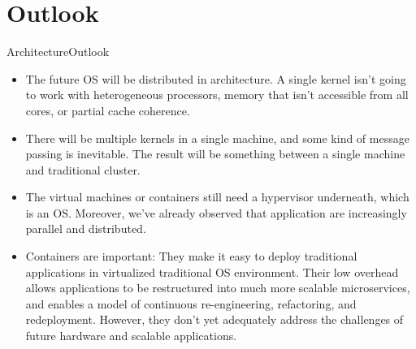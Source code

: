 \documentclass[10pt]{beamer}
\begin{document}
\section{Outlook}
\begin{frame}{Architecture}{Outlook}
  \begin{itemize}
    \item The future OS will be distributed in architecture. A single kernel
          isn't going to work with heterogeneous processors, memory that isn't
          accessible from all cores, or partial cache coherence.
    \item There will be multiple kernels in a single machine, and some kind of
          message passing is inevitable. The result will be something between a
          single machine and traditional cluster.
    \item The virtual machines or containers still need a hypervisor
          underneath, which is an OS. Moreover, we've already observed that
          application are increasingly parallel and distributed.
    \item Containers are important: They make it easy to deploy traditional
          applications in virtualized traditional OS environment. Their low
          overhead allows applications to be restructured into much more
          scalable microservices, and enables a model of continuous
          re-engineering, refactoring, and redeployment. However, they don't
          yet adequately address the challenges of future hardware and scalable
          applications.
  \end{itemize}
\end{frame}

\end{document}
